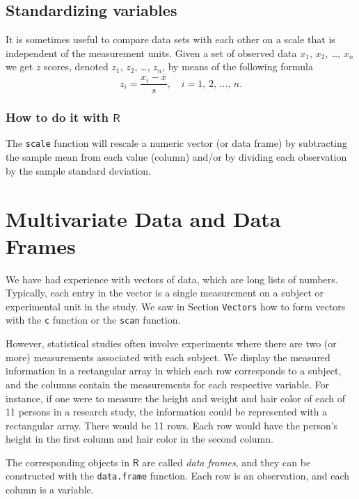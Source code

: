 \documentclass[10pt,english]{scrbook}
\begin{document}
\subsection[Standardizing variables]{Standardizing variables}
\label{sec-1-4-5}

It is sometimes useful to compare data sets with each other on a scale that is independent of the measurement units. Given a set of observed data \(x_{1}\), \(x_{2}\), \ldots{}, \(x_{n}\) we get \(z\) scores, denoted \(z_{1}\), \(z_{2}\), \ldots{}, \(z_{n}\), by means of the following formula
\[
z_{i}=\frac{x_{i}-\overline{x}}{s},\quad i=1,\,2,\,\ldots,\, n.
\]

\subsubsection[How to do it with \(\mathsf{R}\)]{How to do it with \(\mathsf{R}\)}
\label{sec-1-4-5-1}

The \texttt{scale} function will rescale a numeric vector (or data frame) by subtracting the sample mean from each value (column) and/or by dividing each observation by the sample standard deviation.
\section[Multivariate Data and Data Frames]{Multivariate Data and Data Frames}
\label{sec-1-5}

We have had experience with vectors of data, which are long lists of numbers. Typically, each entry in the vector is a single measurement on a subject or experimental unit in the study. We saw in Section \texttt{Vectors} how to form vectors with the \texttt{c} function or the \texttt{scan} function. 

However, statistical studies often involve experiments where there are two (or more) measurements associated with each subject. We display the measured information in a rectangular array in which each row corresponds to a subject, and the columns contain the measurements for each respective variable. For instance, if one were to measure the height and weight and hair color of each of 11 persons in a research study, the information could be represented with a rectangular array. There would be 11 rows. Each row would have the person's height in the first column and hair color in the second column.

The corresponding objects in \(\mathsf{R}\) are called \emph{data frames}, and they can be constructed with the \texttt{data.frame} function. Each row is an observation, and each column is a variable.
\end{document}

